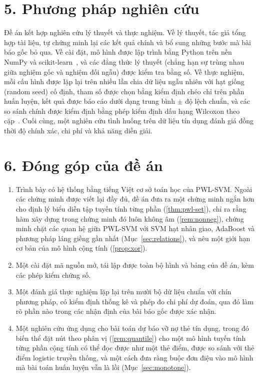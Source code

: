 \section*{5. Phương pháp nghiên cứu}

Đề án kết hợp nghiên cứu lý thuyết và thực nghiệm. Về lý thuyết, tác giả tổng hợp tài liệu, tự chứng minh lại các kết quả chính và bổ sung những bước mà bài báo gốc bỏ qua. Về cài đặt, mô hình được lập trình bằng Python trên nền NumPy và scikit-learn~\cite{pedregosa2011}, và các đẳng thức lý thuyết (chẳng hạn sự trùng nhau giữa nghiệm gốc và nghiệm đối ngẫu) được kiểm tra bằng số. Về thực nghiệm, mỗi cấu hình được lặp lại trên nhiều lần chia dữ liệu ngẫu nhiên với hạt giống (random seed) cố định, tham số được chọn bằng kiểm định chéo chỉ trên phần huấn luyện, kết quả được báo cáo dưới dạng trung bình $\pm$ độ lệch chuẩn, và các so sánh chính được kiểm định bằng phép kiểm định dấu hạng Wilcoxon theo cặp~\cite{demsar2006}. Cuối cùng, một nghiên cứu tình huống trên dữ liệu tín dụng đánh giá đồng thời độ chính xác, chi phí và khả năng diễn giải.

\section*{6. Đóng góp của đề án}

\begin{enumerate}[label=(\arabic*)]
\item Trình bày có hệ thống bằng tiếng Việt cơ sở toán học của PWL-SVM. Ngoài các chứng minh được viết lại đầy đủ, đề án đưa ra một chứng minh ngắn hơn cho định lý biểu diễn tập tuyến tính từng phần (\cref{thm:pwl-set}), chỉ ra rằng hàm xây dựng trong chứng minh đó luôn không âm (\cref{rem:nonneg}), chứng minh chặt các quan hệ giữa PWL-SVM với SVM hạt nhân giao, AdaBoost và phương pháp láng giềng gần nhất (Mục~\ref{sec:relations}), và nêu một giới hạn cơ bản của mô hình cộng tính (\cref{prop:xor}).
\item Một cài đặt mã nguồn mở, tái lập được toàn bộ hình và bảng của đề án, kèm các phép kiểm chứng số.
\item Một đánh giá thực nghiệm lặp lại trên mười bộ dữ liệu chuẩn với chín phương pháp, có kiểm định thống kê và phép đo chi phí dự đoán, qua đó làm rõ phần nào trong các nhận định của bài báo gốc được xác nhận.
\item Một nghiên cứu ứng dụng cho bài toán dự báo vỡ nợ thẻ tín dụng, trong đó biến thể đặt nút theo phân vị (\cref{rem:quantile}) cho một mô hình tuyến tính từng phần cộng tính có thể đọc được như một thẻ điểm, được so sánh với thẻ điểm logistic truyền thống, và một cách đưa ràng buộc đơn điệu vào mô hình mà bài toán huấn luyện vẫn là lồi (Mục~\ref{sec:monotone}).
\end{enumerate}

